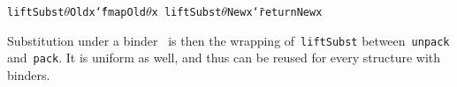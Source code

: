 \documentclass[9pt,authoryear]{sigplanconf}
\begin{document}
{{}\vphantom{$\{$}}\texttt{liftSubst}\texttt{\mbox{\hspace{0.50em}}}\texttt{\makebox[1.22ex][c]{\_{}}}\texttt{\mbox{\hspace{0.50em}}}\texttt{$ \theta $}\texttt{\mbox{\hspace{0.50em}}}\texttt{\makebox[1.22ex][l]{$ {(} $}}\texttt{Old}\texttt{\mbox{\hspace{0.50em}}}\texttt{x}\texttt{\makebox[1.22ex][r]{$ {)} $}}\texttt{\mbox{\hspace{0.50em}}}\texttt{{\char `\=}}\texttt{\mbox{\hspace{0.50em}}}\texttt{fmap}\texttt{\mbox{\hspace{0.50em}}}\texttt{Old}\texttt{\mbox{\hspace{0.50em}}}\texttt{\makebox[1.22ex][l]{$ {(} $}}\texttt{$ \theta $}\texttt{\mbox{\hspace{0.50em}}}\texttt{x}\texttt{\makebox[1.22ex][r]{$ {)} $}}\texttt{{\nopagebreak \newline%
}\vphantom{$\{$}}\texttt{liftSubst}\texttt{\mbox{\hspace{0.50em}}}\texttt{\makebox[1.22ex][c]{\_{}}}\texttt{\mbox{\hspace{0.50em}}}\texttt{$ \theta $}\texttt{\mbox{\hspace{0.50em}}}\texttt{\makebox[1.22ex][l]{$ {(} $}}\texttt{New}\texttt{\mbox{\hspace{0.50em}}}\texttt{x}\texttt{\makebox[1.22ex][r]{$ {)} $}}\texttt{\mbox{\hspace{0.50em}}}\texttt{{\char `\=}}\texttt{\mbox{\hspace{0.50em}}}\texttt{return}\texttt{\mbox{\hspace{0.50em}}}\texttt{\makebox[1.22ex][l]{$ {(} $}}\texttt{New}\texttt{\mbox{\hspace{0.50em}}}\texttt{x}\texttt{\makebox[1.22ex][r]{$ {)} $}}\texttt{{\nopagebreak \newline%
}\vphantom{$\{$}}%


%
Substitution under a binder{~}\texttt{\makebox[1.22ex][l]{$ {(} $}}\texttt{\makebox[1.22ex][c]{\textgreater{}}\makebox[1.22ex][c]{\textgreater{}}}\texttt{\makebox[1.22ex][r]{$ {)} $}} is then the wrapping
    of{~}\texttt{liftSubst} between{~}\texttt{unpack} and{~}\texttt{pack}. It is uniform as
    well, and thus can be reused for every structure with binders.%


{\nopagebreak }
\end{document}
